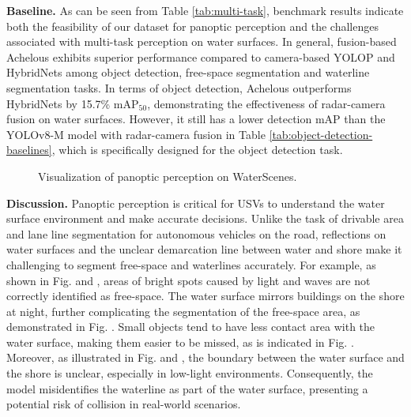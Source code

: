 \documentclass[lettersize,journal]{IEEEtran}
\begin{document}
\textbf{Baseline.} As can be seen from Table \ref{tab:multi-task}, benchmark results indicate both the feasibility of our dataset for panoptic perception and the challenges associated with multi-task perception on water surfaces.
In general, fusion-based Achelous exhibits superior performance compared to camera-based YOLOP and HybridNets among object detection, free-space segmentation and waterline segmentation tasks. In terms of object detection, Achelous outperforms HybridNets by 15.7\% mAP$_{50}$, demonstrating the effectiveness of radar-camera fusion on water surfaces.  
However, it still has a lower detection mAP than the YOLOv8-M model with radar-camera fusion in Table \ref{tab:object-detection-baselines}, which is specifically designed for the object detection task. 

\begin{figure}[h]
\centering
{}
\hspace{-6.6mm}
\quad
{}
\hspace{-6.6mm}
\quad
{}
\vspace{-2mm}

\centering
{}
\hspace{-6.6mm}
\quad
{}
\hspace{-6.6mm}
\quad
{}
\caption{Visualization of panoptic perception on WaterScenes.}
\label{fig:multi-task}
\end{figure}

\textbf{Discussion.} Panoptic perception is critical for USVs to understand the water surface environment and make accurate decisions. Unlike the task of drivable area and lane line segmentation for autonomous vehicles on the road, reflections on water surfaces and the unclear demarcation line between water and shore make it challenging to segment free-space and waterlines accurately.
For example, as shown in Fig.  and , areas of bright spots caused by light and waves are not correctly identified as free-space. 
The water surface mirrors buildings on the shore at night, further complicating the segmentation of the free-space area, as demonstrated in Fig. . 
Small objects tend to have less contact area with the water surface, making them easier to be missed, as is indicated in Fig. . 
Moreover, as illustrated in Fig.  and , the boundary between the water surface and the shore is unclear, especially in low-light environments. Consequently, the model misidentifies the waterline as part of the water surface, presenting a potential risk of collision in real-world scenarios.
\end{document}
